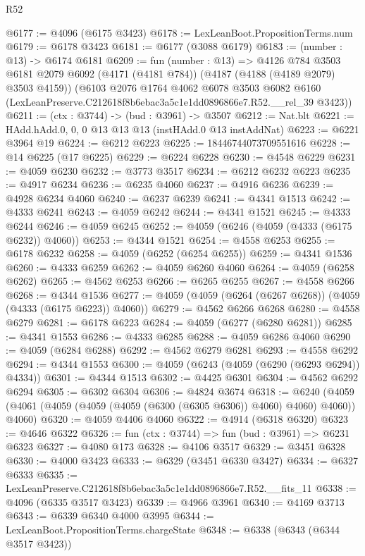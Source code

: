 \begin{lexlean}{R52}
\begin{coremodule}
@6177 := @4096 (@6175 @3423)
@6178 := LexLeanBoot.PropositionTerms.num
@6179 := @6178 @3423
@6181 := @6177 (@3088 @6179)
@6183 := (number : @13) -> @6174 @6181
@6209 := fun (number : @13) =>
  @4126
    @784
    @3503
    @6181
    @2079
    @6092
    (@4171 (@4181 @784))
    (@4187 (@4188 (@4189 @2079) @3503 @4159))
    (@6103
      @2076
      @1764
      @4062
      @6078
      @3503
      @6082
      @6160
      (LexLeanPreserve.C212618f8b6ebac3a5c1e1dd0896866e7.R52.__rel_39 @3423))
@6211 := (ctx : @3744) -> (bud : @3961) -> @3507
@6212 := Nat.blt
@6221 := HAdd.hAdd.{0, 0, 0} @13 @13 @13 (instHAdd.{0} @13 instAddNat)
@6223 := @6221 @3964 @19
@6224 := @6212 @6223
@6225 := 18446744073709551616
@6228 := @14 @6225 (@17 @6225)
@6229 := @6224 @6228
@6230 := @4548 @6229
@6231 := @4059 @6230
@6232 := @3773 @3517
@6234 := @6212 @6232 @6223
@6235 := @4917 @6234
@6236 := @6235 @4060
@6237 := @4916 @6236
@6239 := @4928 @6234 @4060
@6240 := @6237 @6239
@6241 := @4341 @1513
@6242 := @4333 @6241
@6243 := @4059 @6242
@6244 := @4341 @1521
@6245 := @4333 @6244
@6246 := @4059 @6245
@6252 := @4059 (@6246 (@4059 (@4333 (@6175 @6232)) @4060))
@6253 := @4344 @1521
@6254 := @4558 @6253
@6255 := @6178 @6232
@6258 := @4059 (@6252 (@6254 @6255))
@6259 := @4341 @1536
@6260 := @4333 @6259
@6262 := @4059 @6260 @4060
@6264 := @4059 (@6258 @6262)
@6265 := @4562 @6253
@6266 := @6265 @6255
@6267 := @4558 @6266
@6268 := @4344 @1536
@6277 := @4059 (@4059 (@6264 (@6267 @6268)) (@4059 (@4333 (@6175 @6223)) @4060))
@6279 := @4562 @6266 @6268
@6280 := @4558 @6279
@6281 := @6178 @6223
@6284 := @4059 (@6277 (@6280 @6281))
@6285 := @4341 @1553
@6286 := @4333 @6285
@6288 := @4059 @6286 @4060
@6290 := @4059 (@6284 @6288)
@6292 := @4562 @6279 @6281
@6293 := @4558 @6292
@6294 := @4344 @1553
@6300 := @4059 (@6243 (@4059 (@6290 (@6293 @6294)) @4334))
@6301 := @4344 @1513
@6302 := @4425 @6301
@6304 := @4562 @6292 @6294
@6305 := @6302 @6304
@6306 := @4824 @3674
@6318 := @6240 (@4059 (@4061 (@4059 (@4059 (@4059 (@6300 (@6305 @6306)) @4060) @4060) @4060)) @4060)
@6320 := @4059 @4406 @4060
@6322 := @4914 (@6318 @6320)
@6323 := @4646 @6322
@6326 := fun (ctx : @3744) => fun (bud : @3961) => @6231 @6323
@6327 := @4080 @173
@6328 := @4106 @3517
@6329 := @3451 @6328
@6330 := @4000 @3423
@6333 := @6329 (@3451 @6330 @3427)
@6334 := @6327 @6333
@6335 := LexLeanPreserve.C212618f8b6ebac3a5c1e1dd0896866e7.R52.__fits_11
@6338 := @4096 (@6335 @3517 @3423)
@6339 := @4966 @3961
@6340 := @4169 @3713
@6343 := @6339 @6340 @4000 @3995
@6344 := LexLeanBoot.PropositionTerms.chargeState
@6348 := @6338 (@6343 (@6344 @3517 @3423))

\end{coremodule}
\end{lexlean}
